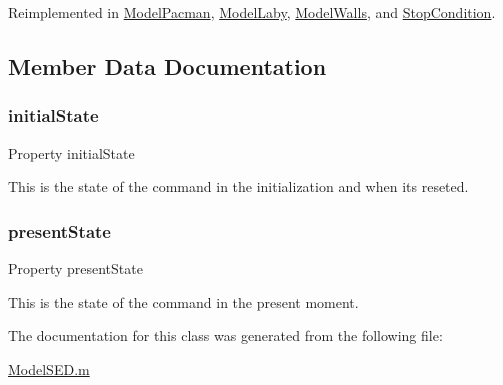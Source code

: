 Reimplemented in \hyperlink{class_model_pacman_a3140f24c6c4b80037b7d4f521c6ae2d3}{Model\+Pacman}, \hyperlink{class_model_laby_a3140f24c6c4b80037b7d4f521c6ae2d3}{Model\+Laby}, \hyperlink{class_model_walls_a3140f24c6c4b80037b7d4f521c6ae2d3}{Model\+Walls}, and \hyperlink{class_stop_condition_a3140f24c6c4b80037b7d4f521c6ae2d3}{Stop\+Condition}.



\subsection{Member Data Documentation}
\mbox{\label{class_model_s_e_d_acd9263acfa96c9138afdf497e55acc24}} 
\subsubsection{\texorpdfstring{initial\+State}{initialState}}
{\footnotesize\ttfamily Property initial\+State}



This is the state of the command in the initialization and when it\textquotesingle{}s reseted. 

\mbox{\label{class_model_s_e_d_a9624cc7c421a50fa5086b0ebd0cd5fe3}} 
\subsubsection{\texorpdfstring{present\+State}{presentState}}
{\footnotesize\ttfamily Property present\+State}



This is the state of the command in the present moment. 



The documentation for this class was generated from the following file\+:\begin{DoxyCompactItemize}
\item 
\hyperlink{_model_s_e_d_8m}{Model\+S\+E\+D.\+m}\end{DoxyCompactItemize}
